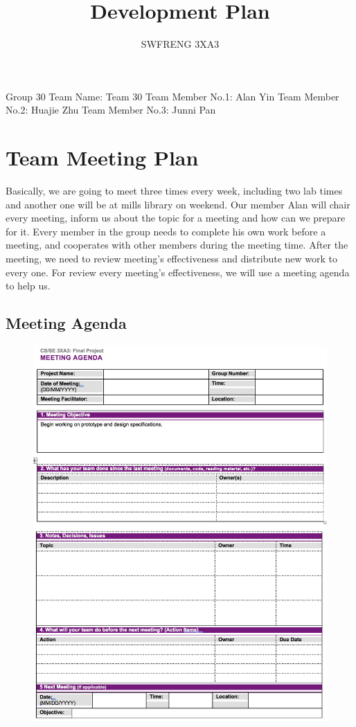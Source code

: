 \documentclass[12pt]{article}
\title{Development Plan}
\author{ SWFRENG 3XA3 }
\begin{document}
\maketitle
\noindent
Group 30
\newline
Team Name: Team 30
\newline
Team Member No.1: Alan Yin
\newline
Team Member No.2: Huajie Zhu
\newline
Team Member No.3: Junni Pan

\section{Team Meeting Plan}
Basically, we are going to meet three times every week, including two lab times and another one will be at mills library on weekend. Our member Alan will chair every meeting, inform us about the topic for a meeting and how can we prepare for it. Every member in the group needs to complete his own work before a meeting, and cooperates with other members during the meeting time. After the meeting, we need to review meeting's effectiveness and distribute new work to every one. For review every meeting's effectiveness, we will use a meeting agenda to help us.


\subsection*{Meeting Agenda}

\begin{figure}
\centering
\includegraphics[width=15cm]{img/meetingAgenda.png}
\end{figure}
\end{document}
